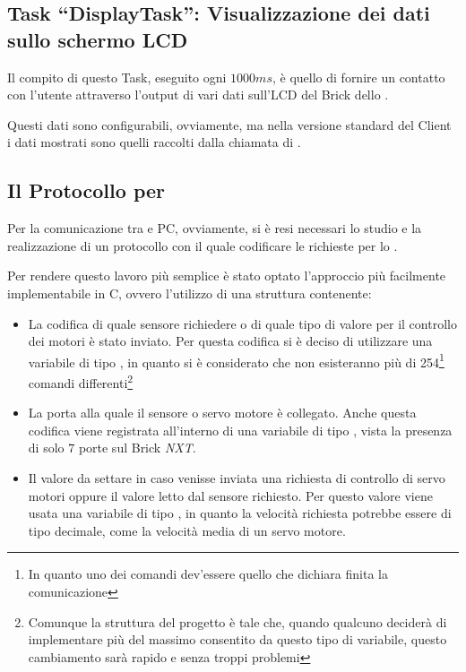 \subsection[Task ``DisplayTask'']{Task ``DisplayTask'': Visualizzazione dei
dati sullo schermo LCD}\label{sec:BROLCDS}
Il compito di questo Task, eseguito ogni $1000ms$, è quello di fornire un
contatto con l'utente attraverso l'output di vari dati sull'LCD del Brick
dello \SPAM{}.

Questi dati sono configurabili, ovviamente, ma nella versione standard del
Client \BROFist{} i dati mostrati sono quelli raccolti dalla chiamata di
\nxtOSEK{} .

\subsection{Il Protocollo per \BROFist{}}\label{sec:theProtocol}
Per la comunicazione tra \SPAM{} e PC, ovviamente, si è resi necessari lo
studio e la realizzazione di un protocollo con il quale codificare le
richieste per lo \SPAM{}.

Per rendere questo lavoro più semplice è stato optato l'approccio più
facilmente implementabile in C, ovvero l'utilizzo di una struttura
contenente:
\begin{itemize}
    \item La codifica di quale sensore richiedere o di quale tipo di valore
        per il controllo dei motori è stato inviato. Per questa codifica si
        è deciso di utilizzare una variabile di tipo ,
        in quanto si è considerato che non esisteranno più di
        254\footnote{In quanto uno dei comandi dev'essere quello che
        dichiara finita la comunicazione} comandi
        differenti\footnote{Comunque la struttura del progetto è tale che,
        quando qualcuno deciderà di implementare più del massimo consentito
        da questo tipo di variabile, questo cambiamento sarà rapido e senza
        troppi problemi}
    \item La porta alla quale il sensore o servo motore è collegato. Anche
        questa codifica viene registrata all'interno di una variabile di
        tipo , vista la presenza di solo $7$ porte sul
        Brick \emph{NXT}.
    \item Il valore da settare in caso venisse inviata una richiesta di
        controllo di servo motori oppure il valore letto dal sensore
        richiesto. Per questo valore viene usata una variabile di tipo
        , in quanto la velocità richiesta potrebbe essere
        di tipo decimale, come la velocità media di un servo motore.
\end{itemize}

